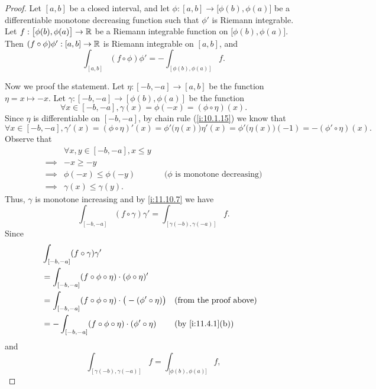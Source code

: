 \begin{proof}
  Let \([a, b]\) be a closed interval, and let \(\phi : [a, b] \to \big[\phi(b), \phi(a)\big]\) be a differentiable monotone decreasing function such that \(\phi'\) is Riemann integrable.
  Let \(f : \big[\phi(b), \phi(a)\big] \to \mathbb{R}\) be a Riemann integrable function on \(\big[\phi(b), \phi(a)\big]\).
  Then \((f \circ \phi) \phi' : [a, b] \to \mathbb{R}\) is Riemann integrable on \([a, b]\), and
  \[
    \int_{[a, b]} (f \circ \phi) \phi' = -\int_{[\phi(b), \phi(a)]} f.
  \]

  Now we proof the statement.
  Let \(\eta : [-b, -a] \to [a, b]\) be the function \(\eta = x \mapsto -x\).
  Let \(\gamma : [-b, -a] \to [\phi(b), \phi(a)]\) be the function
  \[
    \forall x \in [-b, -a], \gamma(x) = \phi(-x) = (\phi \circ \eta)(x).
  \]
  Since \(\eta\) is differentiable on \([-b, -a]\), by chain rule (\cref{i:10.1.15}) we know that
  \[
    \forall x \in [-b, -a], \gamma'(x) = (\phi \circ \eta)'(x) = \phi'\big(\eta(x)\big) \eta'(x) = \phi'\big(\eta(x)\big) (-1) = - (\phi' \circ \eta)(x).
  \]
  Observe that
  \begin{align*}
             & \forall x, y \in [-b, -a], x \leq y                                               \\
    \implies & -x \geq -y                                                                        \\
    \implies & \phi(-x) \leq \phi(-y)              &  & \text{(\(\phi\) is monotone decreasing)} \\
    \implies & \gamma(x) \leq \gamma(y).
  \end{align*}
  Thus, \(\gamma\) is monotone increasing and by \cref{i:11.10.7} we have
  \[
    \int_{[-b, -a]} (f \circ \gamma) \gamma' = \int_{[\gamma(-b), \gamma(-a)]} f.
  \]
  Since
  \begin{align*}
     & \int_{[-b, -a]} (f \circ \gamma) \gamma'                                                                           \\
     & = \int_{[-b, -a]} (f \circ \phi \circ \eta) \cdot (\phi \circ \eta)'                                               \\
     & = \int_{[-b, -a]} (f \circ \phi \circ \eta) \cdot \big(-(\phi' \circ \eta)\big) &  & \text{(from the proof above)} \\
     & = -\int_{[-b, -a]} (f \circ \phi \circ \eta) \cdot (\phi' \circ \eta)           &  & \by{i:11.4.1}[b]
  \end{align*}
  and
  \[
    \int_{[\gamma(-b), \gamma(-a)]} f = \int_{\big[\phi(b), \phi(a)\big]} f,
\]
\end{proof}
